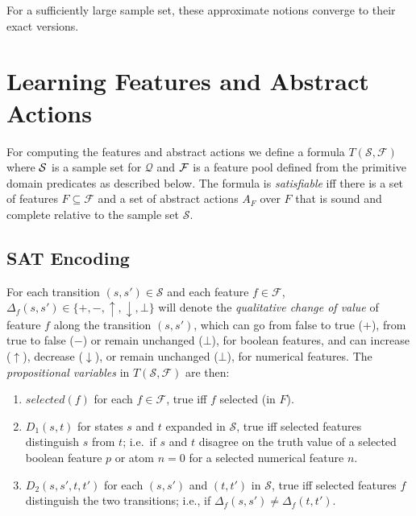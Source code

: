 \documentclass[letterpaper]{article} %
\newcommand{\Q}{\mathcal{Q}}
\newcommand{\F}{\mathcal{F}}
\renewcommand{\S}{\mathcal{S}}
\begin{document}
For a sufficiently large sample set, these approximate notions converge to their exact versions.

\section{Learning Features and Abstract Actions}

For computing the features and abstract actions we define a formula
$T(\S,\F)$ where ${\cal S}$ is a sample set for $\Q$ and $\cal F$
is a feature pool defined from the primitive domain predicates
as described below. The formula is  \emph{satisfiable} iff there is a set of
features $F \subseteq \F$ and a set of abstract actions $A_F$
over $F$ that is sound and complete relative to the sample set
$\S$.


\subsection{SAT Encoding}

For each transition  $(s, s') \in \S$ and each feature $f \in \F$,
$\Delta_f(s, s') \in \{+, -, \uparrow, \downarrow, \bot\}$ will denote the
\emph{qualitative change of value} of feature $f$ along the transition $(s, s')$,
which can go from false to true ($+$), from true to false ($-$) or remain
unchanged ($\bot$), for boolean features, and can increase ($\uparrow$),
decrease ($\downarrow$), or remain unchanged ($\bot$), for numerical features.
The \emph{propositional variables} in $T(\S,\F)$ are then:
\begin{enumerate}[{\small$\bullet$}]
  \item $selected(f)$ for each $f \in \F$, true iff $f$ selected (in $F$).
  \item $D_1(s,t)$ for states $s$ and $t$ expanded in $\S$,  true iff
    selected features distinguish $s$ from $t$; i.e.\ if $s$ and $t$ disagree
    on the truth value of a selected boolean feature $p$ or atom $n=0$ for a
    selected numerical feature $n$.
  \item $D_2(s, s', t, t')$ for each $(s, s')$ and $(t, t')$ in $\S$,
    true iff selected features $f$ distinguish the two transitions; i.e., if
    $\Delta_f(s, s')\not=\Delta_f(t,t')$. 
\end{enumerate}
\end{document}
